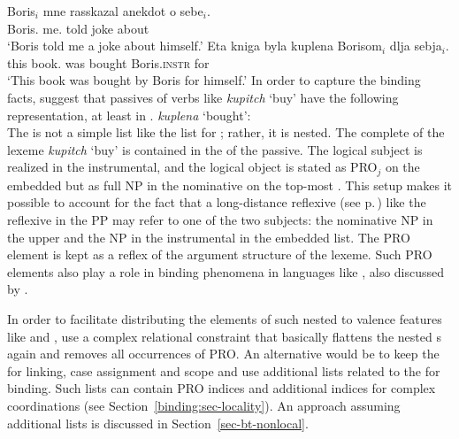 \documentclass[output=paper,biblatex,babelshorthands,newtxmath,draftmode,colorlinks,citecolor=brown]{langscibook}
\begin{document}
\eal
\label{binding:russian-pass}
\ex  
\gll Boris$_i$    mne      rasskazal anekdot o sebe$_i$.\\
     Boris.\nom{} me.\dat{} told      joke    about \self\\
\glt `Boris told me a joke about himself.'
\ex
\gll Eta kniga byla kuplena Borisom$_{i}$ dlja sebja$_{i}$.  \\
     this book.\nom{} was bought Boris.\textsc{instr} for \self  \\
\glt `This book was bought by Boris for himself.'
\zl
In order to capture the binding facts, \citet{MS98a} suggest that passives of verbs like
\emph{kupitch} `buy' have the following representation, at least in .
\ea
\emph{kuplena} `bought':\\
\z
The \argstl is not a simple list like the list for ; rather, it is nested. The complete \argstl of
the lexeme \emph{kupitch} `buy' is contained in the \argstl of the passive. The logical subject is
realized in the instrumental, and the logical object is stated as PRO$_j$ on the embedded \argst but
as full NP in the nominative on the top-most \argstl. This setup makes it possible to account for
the fact that a long-distance reflexive (see p.\,\pageref{page-long-distance-reflexives}) like the
reflexive in the PP may refer to one of the two subjects: the nominative NP in the upper \argstl and
the NP in the instrumental in the embedded list. The PRO element is kept as a reflex of the
argument structure of the lexeme. Such PRO elements also play a role in binding phenomena in languages
like , also discussed by \citeauthor{MS98a}.

In order to facilitate distributing the elements of such nested \argstls to valence features like
\subj and \comps, \citet[, 140]{MS98a} use a complex relational constraint that basically flattens the
nested \argst{}s again and removes all occurrences of PRO. An alternative would be to keep the
\argstl for linking, case assignment and scope and use additional lists related to the \argstl for
binding. Such lists can contain PRO indices and additional indices for complex coordinations (see
Section~\ref{binding:sec-locality}). An approach assuming additional lists is discussed in Section~\ref{sec-bt-nonlocal}.
\end{document}
